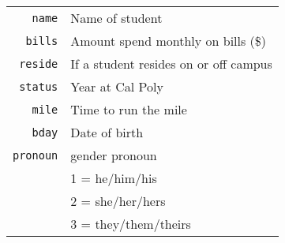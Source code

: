 





\vskip10pt
\begin{tabular}{r|l}
\texttt{name} & Name of student \\
\texttt{bills} & Amount spend monthly on bills (\$) \\
\texttt{reside} & If a student resides on or off campus \\
\texttt{status} & Year at Cal Poly \\
\texttt{mile} & Time to run the mile \\
\texttt{bday} & Date of birth  \\
\texttt{pronoun} & gender pronoun \\
                 & 1 = he/him/his \\
                 & 2 = she/her/hers \\
                 & 3 = they/them/theirs \\
\end{tabular}
\vskip10pt


